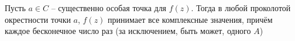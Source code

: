 \begin{theorem}[Пикара]
Пусть $a \in C$ – существенно особая точка для $f(z)$. Тогда в любой проколотой окрестности
точки $a$, $f(z)$ принимает все комплексные значения, причём каждое бесконечное число раз
(за исключением, быть может, одного $A$)
\end{theorem}


